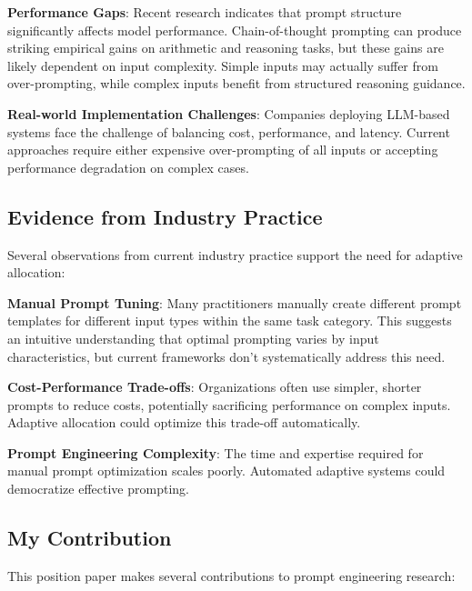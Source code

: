 \documentclass[11pt,a4paper]{article}
\begin{document}
\textbf{Performance Gaps}: Recent research indicates that prompt structure significantly affects model performance. Chain-of-thought prompting can produce striking empirical gains on arithmetic and reasoning tasks, but these gains are likely dependent on input complexity. Simple inputs may actually suffer from over-prompting, while complex inputs benefit from structured reasoning guidance.

\textbf{Real-world Implementation Challenges}: Companies deploying LLM-based systems face the challenge of balancing cost, performance, and latency. Current approaches require either expensive over-prompting of all inputs or accepting performance degradation on complex cases.

\subsection{Evidence from Industry Practice}

Several observations from current industry practice support the need for adaptive allocation:

\textbf{Manual Prompt Tuning}: Many practitioners manually create different prompt templates for different input types within the same task category. This suggests an intuitive understanding that optimal prompting varies by input characteristics, but current frameworks don't systematically address this need.

\textbf{Cost-Performance Trade-offs}: Organizations often use simpler, shorter prompts to reduce costs, potentially sacrificing performance on complex inputs. Adaptive allocation could optimize this trade-off automatically.

\textbf{Prompt Engineering Complexity}: The time and expertise required for manual prompt optimization scales poorly. Automated adaptive systems could democratize effective prompting.

\subsection{My Contribution}

This position paper makes several contributions to prompt engineering research:
\end{document}
